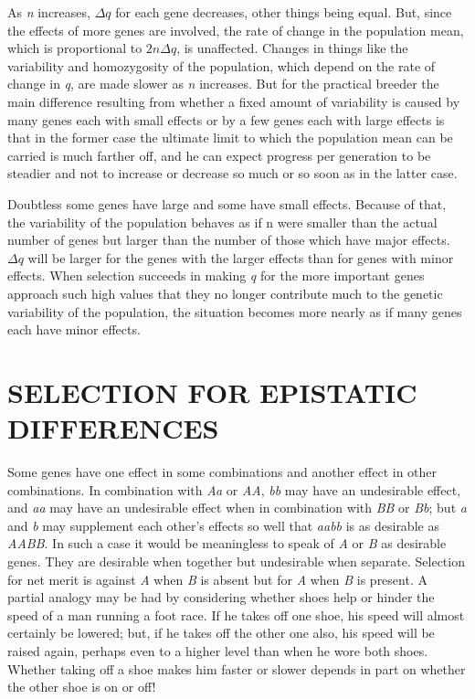 As \textit{n} increases, $\Delta q$ for each gene decreases, other things being equal.
But, since the effects of more genes are involved, the rate of change in
the population mean, which is proportional to $2n{\Delta}q$, is unaffected.
Changes in things like the variability and homozygosity of the population,
which depend on the rate of change in \textit{q}, are made slower as \textit{n}
increases. But for the practical breeder the main difference resulting
from whether a fixed amount of variability is caused by many genes
each with small effects or by a few genes each with large effects is that in
the former case the ultimate limit to which the population mean can
be carried is much farther off, and he can expect progress per generation
to be steadier and not to increase or decrease so much or so soon as
in the latter case.

Doubtless some genes have large and some have small effects.
Because of that, the variability of the population behaves as if n were
smaller than the actual number of genes but larger than the number of
those which have major effects. ${\Delta}q$ will be larger for the genes with the
larger effects than for genes with minor effects. When selection succeeds
in making \textit{q} for the more important genes approach such high values
that they no longer contribute much to the genetic variability of the
population, the situation becomes more nearly as if many genes each
have minor effects.

\section*{SELECTION FOR EPISTATIC DIFFERENCES}

Some genes have one effect in some combinations and another effect
in other combinations. In combination with \textit{Aa} or \textit{AA}, \textit{bb} may have an
undesirable effect, and \textit{aa} may have an undesirable effect when in combination
with \textit{BB} or \textit{Bb}; but \textit{a} and \textit{b} may supplement each other's
effects so well that \textit{aabb} is as desirable as \textit{AABB}. In such a case it would
be meaningless to speak of \textit{A} or \textit{B} as desirable genes. They are desirable
when together but undesirable when separate. Selection for net merit is
against \textit{A} when \textit{B} is absent but for \textit{A} when \textit{B} is present. A partial analogy
may be had by considering whether shoes help or hinder the speed
of a man running a foot race. If he takes off one shoe, his speed will
almost certainly be lowered; but, if he takes off the other one also, his
speed will be raised again, perhaps even to a higher level than when he
wore both shoes. Whether taking off a shoe makes him faster or slower
depends in part on whether the other shoe is on or off!


